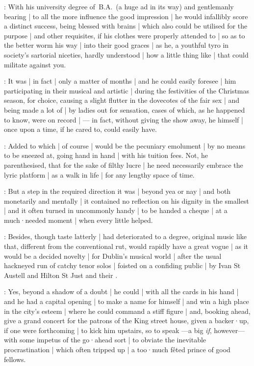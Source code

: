 :
With his university degree of~B.A.\ 
(a huge ad in its way)
and gentlemanly bearing |
to all the more influence the good impression |
he would infallibly score a distinct success,
being blessed with brains |
which also could be utilised for the purpose |
and other requisites,
if his clothes were properly attended to |
so as to the better worm his way |
into their good graces |
as he,
a youthful tyro in society's sartorial niceties,
hardly understood |
how a little thing like |
that could militate against you.

:
It was |
in fact |
only a matter of months |
and he could easily foresee |
him participating in their musical and artistic  |
during the festivities of the Christmas season,
for choice,
causing a slight flutter in the dovecotes of the fair sex |
and being made a lot of |
by ladies out for sensation,
cases of which,
as he happened to know,
were on record |
--- in fact,
without giving the show away,
he himself |
once upon a time,
if he cared to,
could easily have.

:
Added to which |
of course |
would be the pecuniary emolument |
by no means to be sneezed at,
going hand in hand |
with his tuition fees.
Not,
he parenthesised,
that for the sake of filthy lucre |
he need necessarily embrace the lyric platform |
as a walk in life |
for any lengthy space of time.

:
But a step in the required direction it was |
beyond yea or nay |
and both monetarily and mentally |
it contained no reflection on his dignity in the smallest |
and it often turned in uncommonly handy |
to be handed a cheque |
at a much·needed moment |
when every little helped.

:
Besides,
though taste latterly |
had deteriorated to a degree,
original music like that,
different from the conventional rut,
would rapidly have a great vogue |
as it would be a decided novelty |
for Dublin's musical world |
after the usual hackneyed run of catchy tenor solos |
foisted on a confiding public |
by Ivan St Austell and Hilton St Just and their .

:
Yes,
beyond a shadow of a doubt |
he could |
with all the cards in his hand |
and he had a capital opening |
to make a name for himself |
and win a high place in the city's esteem |
where he could command a stiff figure |
and,
booking ahead,
give a grand concert for the patrons of the King street house,
given a backer·up,
if one were forthcoming |
to kick him upstairs,
so to speak%
---a big \emph{if}, however---%
with some impetus of the go·ahead sort |
to obviate the inevitable procrastination |
which often tripped up |
a too·much fêted prince of good fellows.

